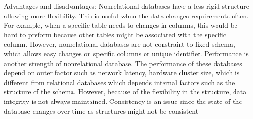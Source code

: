 Advantages and disadvantages:
Nonrelational databases have a less rigid structure allowing more flexibility.
This is useful when the data changes requirements often. For example, when a specific table needs to changes in columns, 
this would be hard to preform because other tables might be associated with the specific column. 
However, nonrelational databases are not constraint to fixed schema, which allows easy changes on specific columns or unique identifier.
Performance is another strength of nonrelational database. 
The performance of these databases depend on outer factor such as network latency, hardware cluster size,
which is different from relational databases which depends internal factors such as the structure of the schema. 
However, because of the flexibility in the structure, data integrity is not always maintained. 
Consistency is an issue since the state of the database changes over time as structures might not be consistent.



